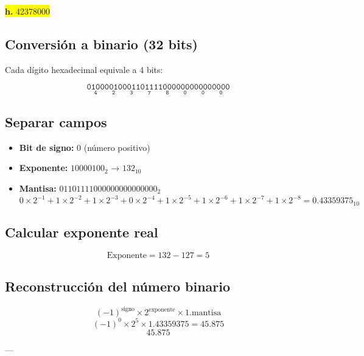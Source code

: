 \documentclass[a4paper,12pt]{article}
\begin{document}
	\newpage
	\begin{center}
		\colorbox{yellow}{\textbf{h.} 42378000}
		\subsection*{Conversión a binario (32 bits)}
		Cada dígito hexadecimal equivale a 4 bits:
		
		\[
		\mathtt{
			\underset{\text{4}}{\boxed{\mathtt{0100}}}
			\underset{\text{2}}{\boxed{\mathtt{0010}}}
			\underset{\text{3}}{\boxed{\mathtt{0011}}}
			\underset{\text{7}}{\boxed{\mathtt{0111}}}
			\underset{\text{8}}{\boxed{\mathtt{1000}}}
			\underset{\text{0}}{\boxed{\mathtt{0000}}}
			\underset{\text{0}}{\boxed{\mathtt{0000}}}
			\underset{\text{0}}{\boxed{\mathtt{0000}}}
		}	
		\]
		
		\subsection*{Separar campos}
		
		\begin{itemize}
			\item \textbf{Bit de signo:} 0 (número positivo)
			\item \textbf{Exponente:} $10000100_2$ → $132_{10}$
			\item \textbf{Mantisa:} $01101111000000000000000_2$ 
			\[
			0\times2^{-1} + 1\times2^{-2} + 1\times2^{-3} + 0\times2^{-4} + 1\times2^{-5} + 1\times2^{-6} + 1\times2^{-7} + 1\times2^{-8}= 0.43359375_{10}
			\]
		\end{itemize}
		
		\subsection*{Calcular exponente real}
		
		\[
		\text{Exponente} = 132 -127 = 5
		\]
		
		
		
		\subsection*{Reconstrucción del número binario}	
		\[
		(-1)^{\text{signo}} \times 2^{\text{exponente}} \times 1.\text{mantisa}
		\]
		\[
		(-1)^0 \times 2^5 \times 1.43359375 = 45.875
		\]
		\vspace{1em}
		\[
		\boxed{45.875}
		\]
		
		---
	\end{center}
\end{document}
